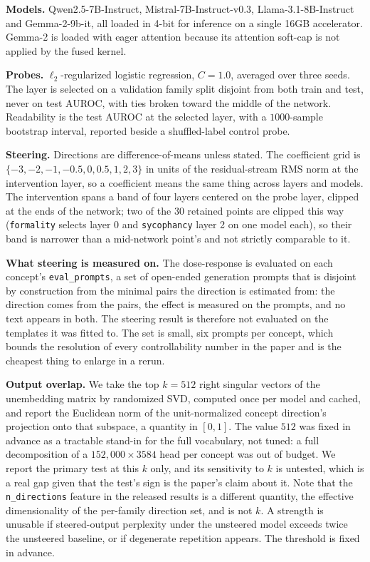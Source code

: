 \documentclass{article}
\begin{document}
\textbf{Models.} Qwen2.5-7B-Instruct, Mistral-7B-Instruct-v0.3,
Llama-3.1-8B-Instruct and Gemma-2-9b-it, all loaded in 4-bit for inference on a
single 16GB accelerator. Gemma-2 is loaded with eager attention because its
attention soft-cap is not applied by the fused kernel.

\textbf{Probes.} $\ell_2$-regularized logistic regression, $C=1.0$, averaged over
three seeds. The layer is selected on a validation family split disjoint from
both train and test, never on test AUROC, with ties broken toward the middle of
the network. Readability is the test AUROC at the selected layer, with a
$1000$-sample bootstrap interval, reported beside a shuffled-label control
probe.

\textbf{Steering.} Directions are difference-of-means unless stated. The
coefficient grid is $\{-3, -2, -1, -0.5, 0, 0.5, 1, 2, 3\}$ in units of the
residual-stream RMS norm at the intervention layer, so a coefficient means the
same thing across layers and models. The intervention spans a band of four
layers centered on the probe layer, clipped at the ends of the network; two of
the 30 retained points are clipped this way (\texttt{formality} selects layer 0
and \texttt{sycophancy} layer 2 on one model each), so their band is narrower
than a mid-network point's and not strictly comparable to it.

\textbf{What steering is measured on.} The dose-response is evaluated on each
concept's \texttt{eval\_prompts}, a set of open-ended generation prompts that is
disjoint by construction from the minimal pairs the direction is estimated from:
the direction comes from the pairs, the effect is measured on the prompts, and no
text appears in both. The steering result is therefore not evaluated on the
templates it was fitted to. The set is small, six prompts per concept, which
bounds the resolution of every controllability number in the paper and is the
cheapest thing to enlarge in a rerun.

\textbf{Output overlap.} We take the top $k=512$ right singular vectors of the
unembedding matrix by randomized SVD, computed once per model and cached, and
report the Euclidean norm of the unit-normalized concept direction's projection
onto that subspace, a quantity in $[0,1]$. The value $512$ was fixed in advance
as a tractable stand-in for the full vocabulary, not tuned: a full decomposition
of a $152{,}000 \times 3584$ head per concept was out of budget. We report the
primary test at this $k$ only, and its sensitivity to $k$ is untested, which is a
real gap given that the test's sign is the paper's claim about it. Note that the
\texttt{n\_directions} feature in the released results is a different quantity,
the effective dimensionality of the per-family direction set, and is not $k$. A strength is unusable if steered-output
perplexity under the unsteered model exceeds twice the unsteered baseline, or
if degenerate repetition appears. The threshold is fixed in advance.
\end{document}
